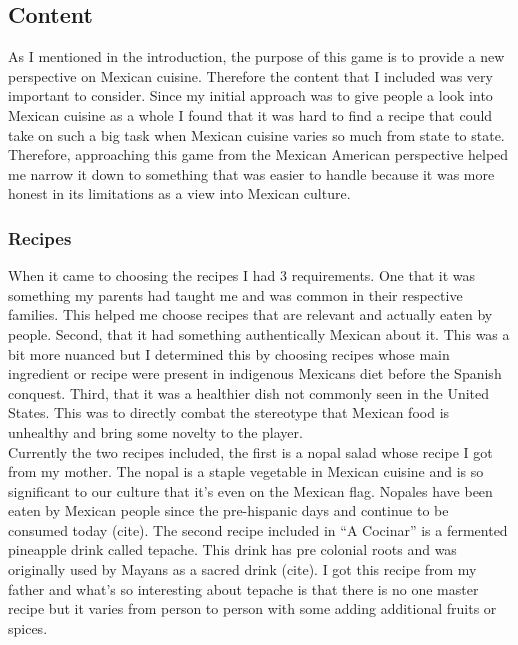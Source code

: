 \documentclass[10pt,twocolumn]{article}
\begin{document}
\subsection{Content}
As I mentioned in the introduction, the purpose of this game is to provide a new perspective on Mexican cuisine. Therefore the content that I included was very important to consider. Since my initial approach was to give people a look into Mexican cuisine as a whole I found that it was hard to find a recipe that could take on such a big task when Mexican cuisine varies so much from state to state. Therefore, approaching this game from the Mexican American perspective helped me narrow it down to something that was easier to handle because it was more honest in its limitations as a view into Mexican culture.

\subsubsection{Recipes}
When it came to choosing the recipes I had 3 requirements. One that it was something my parents had taught me and was common in their respective families. This helped me choose recipes that are relevant and actually eaten by people. Second, that it had something authentically Mexican about it. This was a bit more nuanced but I determined this by choosing recipes whose main ingredient or recipe were present in indigenous Mexicans diet before the Spanish conquest. Third, that it was a healthier dish not commonly seen in the United States. This was to directly combat the stereotype that Mexican food is unhealthy and bring some novelty to the player.  
\\
Currently the two recipes included, the first is a nopal salad whose recipe I got from my mother. The nopal is a staple vegetable in Mexican cuisine and is so significant to our culture that it’s even on the Mexican flag. Nopales have been eaten by Mexican people since the pre-hispanic days and continue to be consumed today (cite). The second recipe included in “A Cocinar'' is a fermented pineapple drink called tepache. This drink has pre colonial roots and was originally used by Mayans as a sacred drink (cite). I got this recipe from my father and what's so interesting about tepache is that there is no one master recipe but it varies from person to person with some adding additional fruits or spices. 
\end{document}
